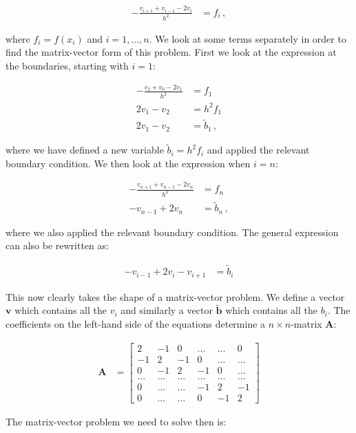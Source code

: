 \documentclass[english,notitlepage,reprint,nofootinbib]{revtex4-1}  %
\begin{document}
\begin{align*}
- \frac{v_{i+1} + v_{i-1} - 2v_i}{h^2} &= f_i \, ,
\end{align*}

where $f_i = f(x_i)$ and $i = 1,...,n$. We look at some terms separately in order to find the matrix-vector form of this problem. First we look at the expression at the boundaries, starting with $i=1$:

\begin{align*}
-\frac{v_2 + v_0 - 2v_1}{h^2} &= f_1 \\
2v_1 - v_2 &= h^2 f_1 \\
2v_1 - v_2 &= \tilde{b}_1 \, ,
\end{align*}

where we have defined a new variable $\tilde{b}_i = h^2 f_i$ and applied the relevant boundary condition. We then look at the expression when $i=n$:

\begin{align*}
-\frac{v_{n+1} + v_{n-1} - 2v_{n}}{h^2} &= f_n \\
-v_{n-1} + 2v_n &= \tilde{b}_n \, ,
\end{align*}

where we also applied the relevant boundary condition. The general expression can also be rewritten as:

\begin{align*}
-v_{i-1} + 2v_i - v_{i+1} &= \tilde{b}_i
\end{align*}

This now clearly takes the shape of a matrix-vector problem. We define a vector $\textbf{v}$ which contains all the $v_i$ and similarly a vector $\tilde{\textbf{b}}$ which contains all the $b_i$. The coefficients on the left-hand side of the equations determine a $n\times n$-matrix \textbf{A}:

\begin{align*}
\textbf{A} &= \begin{bmatrix}
2 & -1 & 0 & ... & ... & 0 \\
-1 & 2 & -1 & 0 & ... & ... \\
0 & -1 & 2 & -1 & 0 & ... \\
... & ... & ... & ... & ... & ... \\
0 & ... & ... & -1 & 2 & -1 \\
0 & ... & ... & 0 & -1 & 2
\end{bmatrix}
\end{align*}

The matrix-vector problem we need to solve then is:
\end{document}
